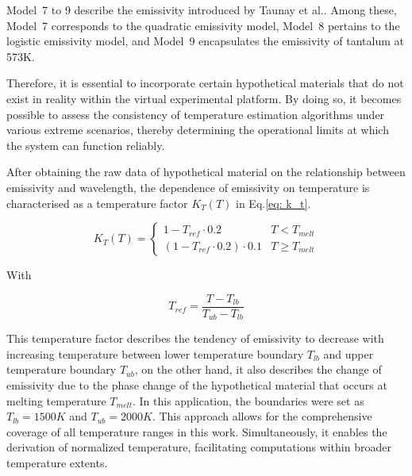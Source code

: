 \mbox{Model 7} to 9 describe the emissivity introduced by Taunay et al.\cite{Taunay.2020b}.
Among these, \mbox{Model 7} corresponds to the quadratic emissivity model, \mbox{Model 8} pertains 
to the logistic emissivity model, 
and \mbox{Model 9} encapsulates the emissivity of tantalum at 573K.


Therefore, it is essential to incorporate certain hypothetical materials 
that do not exist in reality within the virtual experimental platform. 
By doing so, it becomes possible to assess the consistency of temperature 
estimation algorithms under various extreme scenarios, thereby determining 
the operational limits at which the system can function reliably.


After obtaining the raw data of hypothetical material on the relationship between emissivity 
and wavelength, the dependence of emissivity on temperature is characterised
as a temperature factor $K_T(T)$ in Eq.\ref{eq: k_t}.

\begin{equation}
  \label{eq: k_t}
  K_T(T)=\begin{cases}
    1 - T_{ref} \cdot 0.2 &   T<T_{melt}\\
    \left(1 - T_{ref} \cdot 0.2 \right) \cdot 0.1 &  T\geq T_{melt}
  \end{cases}
\end{equation}


With 

\begin{equation}
  \label{eq: t_ref}
  T_{ref}=\frac{T - T_{lb}}{T_{ub} - T_{lb}}
\end{equation}


This temperature factor describes the tendency 
of emissivity to decrease with increasing temperature between lower temperature boundary $T_{lb}$ 
and upper temperature boundary $T_{ub}$, 
on the other hand, it also describes the change of emissivity due to the 
phase change of the hypothetical material that occurs at melting 
temperature $T_{melt}$. In this application, the boundaries were set as $T_{lb} = 1500K$ and $T_{ub} = 2000K$.
This approach allows for the comprehensive coverage of all temperature ranges in this work. 
Simultaneously, it enables the derivation of normalized temperature, facilitating computations 
within broader temperature extents.


